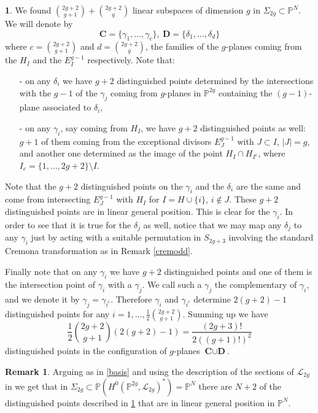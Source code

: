 \documentclass[a4paper,10pt]{amsart}
\theoremstyle{definition}
\newtheorem{Remark}[thm]{Remark}
\newtheorem{say}[thm]{}
\begin{document}
\begin{say}\label{confodd}
We found $\binom{2g+2}{g+1}+\binom{2g+2}{g}$ linear subspaces of dimension $g$ in $\Sigma_{2g}\subset\mathbb{P}^N$. We will denote by 
$$\textbf{C}=\{\gamma_1,\dots,\gamma_{c}\}, \: \textbf{D}=\{\delta_1,\dots,\delta_{d}\}$$
where $c = \binom{2g+2}{g+1}$ and $d = \binom{2g+2}{g}$, the families of the $g$-planes coming from the $H_I$ and the $E_I^{g-1}$ respectively. Note that:
\begin{itemize}
\item[-] on any $\delta_i$ we have $g+2$ distinguished points determined by the intersections with the $g-1$ of the $\gamma_j$ coming from $g$-planes in $\mathbb{P}^{2g}$ containing the $(g-1)$-plane associated to $\delta_i$,
\item[-] on any $\gamma_i$, say coming from $H_I$, we have $g+2$ distinguished points as well: $g+1$ of them coming from the exceptional divisors $E_J^{g-1}$ with $J\subset I$, $|J|=g$, and another one determined as the image of the point $H_I\cap H_{I^c}$, where $I_{c} =\{1,\dots,2g+2\}\setminus I$. 
\end{itemize}
Note that the $g+2$ distinguished points on the $\gamma_i$ and the $\delta_i$ are the same and come from intersecting $E_J^{g-1}$ with $H_I$ for $I = H\cup\{i\}$, $i\notin J$. These $g+2$ distinguished points are in linear general position. This is clear for the $\gamma_i$. In order to see that it is true for the $\delta_j$ as well, notice that we may map any $\delta_j$ to any $\gamma_i$ just by acting with a suitable permutation in $S_{2g+3}$ involving the standard Cremona transformation as in Remark \ref{cremodd}.

Finally note that on any $\gamma_i$ we have $g+2$ distinguished points and one of them is the intersection point of $\gamma_i$ with a $\gamma_j$. We call such a $\gamma_j$ the complementary of $\gamma_i$, and we denote it by $\gamma_j = \gamma_{i^c}$. Therefore $\gamma_i$ and $\gamma_{i^c}$ determine $2(g+2)-1$ distinguished points for any $i = 1,\dots,\frac{1}{2}\binom{2g+2}{g+1}$. Summing up we have 
\begin{equation}\label{distpoints}
\frac{1}{2}\binom{2g+2}{g+1}(2(g+2)-1)= \frac{(2g+3)!}{2((g+1)!)^2}
\end{equation}
distinguished points in the configuration of $g$-planes $\textbf{C}\cup \textbf{D}$.
\end{say}

\begin{Remark}\label{genposodd}
Arguing as in \ref{basis} and using the description of the sections of $\mathcal{L}_{2g}$ in \cite[Section 3.3]{Ku03} we get that in $\Sigma_{2g}\subset \mathbb{P}(H^0(\mathbb{P}^{2g},\mathcal{L}_{2g})^{*}) = \mathbb{P}^N$ there are $N+2$ of the distinguished points described in \ref{confodd} that are in linear general position in $\mathbb{P}^N$.
\end{Remark}
\end{document}
